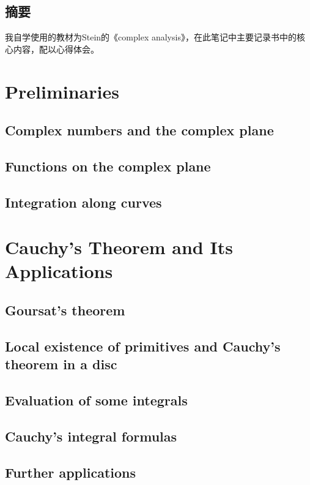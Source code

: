 \documentclass[12pt,a4paper]{article}
\begin{document}
\begin{center}
\section*{摘要}
\end{center}


我自学使用的教材为Stein的《complex analysis》，在此笔记中主要记录书中的核心内容，配以心得体会。


{\centering\tableofcontents}

\newpage
\section{Preliminaries}
\subsection{Complex numbers and the complex plane}
\subsection{Functions on the complex plane }
\subsection{Integration along curves}

\newpage
\section{Cauchy's Theorem and Its Applications }
\subsection{Goursat's theorem}
\subsection{Local existence of primitives and Cauchy's theorem in a
disc}
\subsection{Evaluation of some integrals}
\subsection{Cauchy's integral formulas }
\subsection{Further applications}
\end{document}
